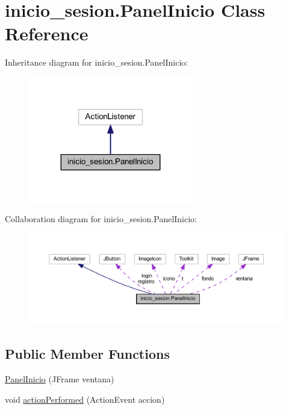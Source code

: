 \hypertarget{classinicio__sesion_1_1_panel_inicio}{}\section{inicio\+\_\+sesion.\+Panel\+Inicio Class Reference}
\label{classinicio__sesion_1_1_panel_inicio}


Inheritance diagram for inicio\+\_\+sesion.\+Panel\+Inicio\+:
\nopagebreak
\begin{figure}[H]
\begin{center}
\leavevmode
\includegraphics[width=203pt]{classinicio__sesion_1_1_panel_inicio__inherit__graph}
\end{center}
\end{figure}


Collaboration diagram for inicio\+\_\+sesion.\+Panel\+Inicio\+:
\nopagebreak
\begin{figure}[H]
\begin{center}
\leavevmode
\includegraphics[width=350pt]{classinicio__sesion_1_1_panel_inicio__coll__graph}
\end{center}
\end{figure}
\subsection*{Public Member Functions}
\begin{DoxyCompactItemize}
\item 
\mbox{\hyperlink{classinicio__sesion_1_1_panel_inicio_a52785308392082e5236bd7baa440e5ee}{Panel\+Inicio}} (J\+Frame ventana)
\item 
void \mbox{\hyperlink{classinicio__sesion_1_1_panel_inicio_adb604bc478a50eb56504e5f411f28431}{action\+Performed}} (Action\+Event accion)
\end{DoxyCompactItemize}


